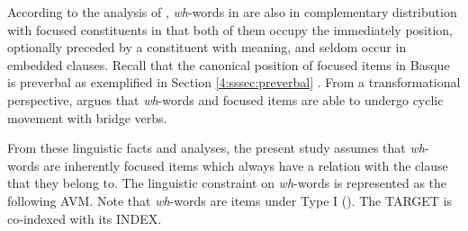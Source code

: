 

\noindent According to the analysis of \citet{urbina:99},
\textit{wh}-words in  are also in complementary distribution with focused
constituents in that both of them occupy the immediately
 position, optionally preceded by a constituent with
 meaning, and seldom occur in embedded clauses. Recall that the
canonical position of focused items in Basque is preverbal as
exemplified in Section \ref{4:sssec:preverbal} .  From a
transformational perspective, \citet{urbina:99} argues that
\textit{wh}-words and focused items are able to undergo cyclic
movement with bridge verbs.



From these linguistic facts and analyses, the present study assumes
that \textit{wh}-words are inherently focused items which always have
a  relation with the clause that they belong to. The
linguistic constraint on \textit{wh}-words is represented as the
following AVM. Note that \textit{wh}-words are 
items under Type I (). The TARGET is
co-indexed with its INDEX.




